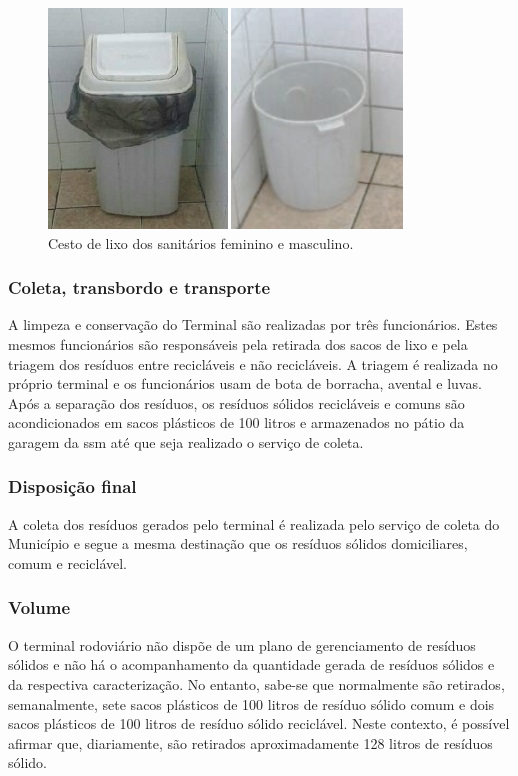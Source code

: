 	
	\begin{figure}
		\centering
		\includegraphics[width=0.5\linewidth]{produtos/prodtres/image088}
		\caption{Cesto de lixo dos sanitários feminino e masculino.}
		\label{fig:image088}
	\end{figure}
	
	
	\subsubsection{Coleta, transbordo e transporte}
	A limpeza e conservação do Terminal são realizadas por três funcionários. Estes mesmos funcionários são responsáveis pela retirada dos sacos de lixo e pela triagem dos resíduos entre recicláveis e não recicláveis. A triagem é realizada no próprio terminal e os funcionários usam de bota de borracha, avental e luvas. Após a separação dos resíduos, os resíduos sólidos recicláveis e comuns são acondicionados em sacos plásticos de 100 litros e armazenados no pátio da garagem da \gls{ssm} até que seja realizado o serviço de coleta.
	
	\subsubsection{Disposição final}
	A coleta dos resíduos gerados pelo terminal é realizada pelo serviço de coleta do Município e segue a mesma destinação que os resíduos sólidos domiciliares, comum e reciclável. 
	
	\subsubsection{Volume}
	O terminal rodoviário não dispõe de um plano de gerenciamento de resíduos sólidos e não há o acompanhamento da quantidade gerada de resíduos sólidos e da respectiva caracterização. No entanto, sabe-se que normalmente são retirados, semanalmente, sete sacos plásticos de 100 litros de resíduo sólido comum e dois sacos plásticos de 100 litros de resíduo sólido reciclável. Neste contexto, é possível afirmar que, diariamente, são retirados aproximadamente 128 litros de resíduos sólido.

